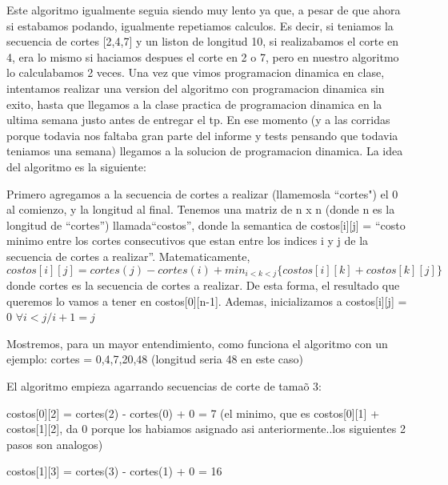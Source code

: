\documentclass[12pt, a4paper,english,spanish]{article}
\begin{document}
Este algoritmo igualmente seguia siendo muy lento ya que, a pesar de que ahora si estabamos podando, igualmente repetiamos calculos. Es decir, si teniamos la secuencia de cortes [2,4,7] y un liston de longitud 10, si realizabamos el corte en 4, era lo mismo si haciamos despues el corte en 2 o 7, pero en nuestro algoritmo lo calculabamos 2 veces. Una vez que vimos programacion dinamica en clase, intentamos realizar una version del algoritmo con programacion dinamica sin exito, hasta que llegamos a la clase practica de programacion dinamica en la ultima semana justo antes de entregar el tp. En ese momento (y a las corridas porque todavia nos faltaba gran parte del informe y tests pensando que todavia teniamos una semana) llegamos a la solucion de programacion dinamica. La idea del algoritmo es la siguiente:

\vspace{0.5cm}

Primero agregamos a la secuencia de cortes a realizar (llamemosla ``cortes") el 0 al comienzo, y la longitud al final. Tenemos una matriz de n x n (donde n es la longitud de ``cortes'') llamada``costos'', donde la semantica de costos[i][j] = ``costo minimo entre los cortes consecutivos que estan entre los indices i y j de la secuencia de cortes a realizar''. Matematicamente, $costos[i][j] = cortes(j) - cortes(i) + min_{ i < k < j} \{costos[i][k] + costos[k][j]\}$  donde cortes es la secuencia de cortes a realizar. De esta forma, el resultado que queremos lo vamos a tener en costos[0][n-1]. Ademas, inicializamos a costos[i][j] = 0 $\forall i < j /  i+1 = j$

\vspace{0.5cm}

Mostremos, para un mayor entendimiento, como funciona el algoritmo con un ejemplo: cortes = {0,4,7,20,48} (longitud seria 48 en este caso)

\vspace{0.5cm}

El algoritmo empieza agarrando secuencias de corte de tama\~o 3:

\vspace{0.5cm}

costos[0][2] = cortes(2) - cortes(0) + 0 = 7 (el minimo, que es costos[0][1] + costos[1][2], da 0 porque los habiamos asignado asi anteriormente..los siguientes 2 pasos son analogos)

\vspace{0.02cm}

costos[1][3] = cortes(3) - cortes(1) + 0 = 16
\end{document}
